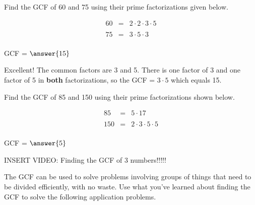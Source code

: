 \documentclass{ximera}[font=12pt]  %
\begin{document}
\begin{problem}
Find the GCF of 60 and 75 using their prime factorizations given below.

\begin{eqnarray*}
60 &=& 2 \cdot 2 \cdot 3 \cdot 5 \\
   & & \\
75 &=& 3 \cdot 5 \cdot 3 \\
\end{eqnarray*}

GCF = $\answer{15}$ 

\begin{feedback}
Excellent!  The common factors are 3 and 5.  There is one factor of 3 and one factor of 5 in \textbf{both} factorizations, so the GCF = $3 \cdot 5$ which equals 15.
\end{feedback}

\end{problem}


\begin{problem}
Find the GCF of 85 and 150 using their prime factorizations shown below.


\begin{eqnarray*}
85 &=& 5 \cdot 17 \\
   & & \\
150 &=& 2 \cdot 3 \cdot 5 \cdot 5 \\
\end{eqnarray*}


GCF = $\answer{5}$

\end{problem}


INSERT VIDEO:  Finding the GCF of 3 numbers!!!!!

The GCF can be used to solve problems involving groups of things that need to be divided efficiently, with no waste.  Use what you've learned
about finding the GCF to solve the following application problems.
\end{document}
